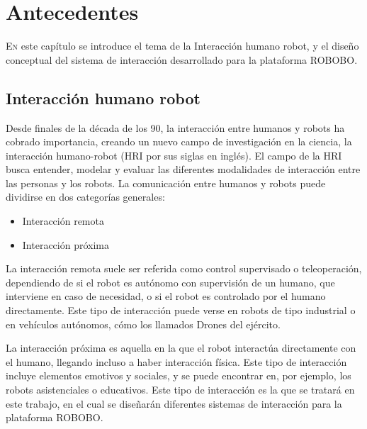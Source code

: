 \chapter{Antecedentes}
\label{chap:antecedentes}





\lettrine{E}{n} este capítulo se introduce el tema de la Interacción humano robot, 	y el diseño conceptual del sistema de interacción desarrollado para la plataforma ROBOBO.

\section{Interacción humano robot}
 \label{sec:hri-intro}
 
 Desde finales de la década de los 90, la interacción entre humanos y robots ha cobrado importancia, creando un nuevo campo de investigación en la ciencia\cite{goodrich2007human}, la interacción humano-robot (HRI por sus siglas en inglés). El campo de la HRI busca entender, modelar y evaluar las diferentes modalidades de interacción entre las personas y los robots. La comunicación entre humanos y robots puede dividirse  en dos categorías generales:
 \begin{itemize}
 	\item Interacción remota
 	\item Interacción próxima
 \end{itemize}
 
 La interacción remota suele ser referida como control supervisado o teleoperación, dependiendo de si el robot es autónomo con supervisión de un humano, que interviene en caso de necesidad, o si el robot es controlado por el humano directamente. Este tipo de interacción puede verse en robots de tipo industrial o en vehículos autónomos, cómo los llamados Drones del ejército.
 
 La interacción próxima es aquella en la que el robot interactúa directamente con el humano, llegando incluso a haber interacción física. Este tipo de interacción incluye elementos emotivos y sociales, y se puede encontrar en, por ejemplo, los robots asistenciales o educativos. Este tipo de interacción es la que se tratará en este trabajo, en el cual se diseñarán diferentes sistemas de interacción para la plataforma ROBOBO.
 
